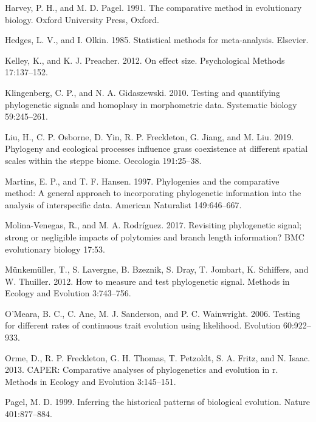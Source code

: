 \documentclass[
]{article}
\begin{document}
{\leavevmode\hypertarget{ref-HarveyPagel1991}{}%
Harvey, P. H., and M. D. Pagel. 1991. The comparative method in
evolutionary biology. Oxford University Press, Oxford.

\leavevmode\hypertarget{ref-HedgesOlkin1985}{}%
Hedges, L. V., and I. Olkin. 1985. Statistical methods for
meta-analysis. Elsevier.

\leavevmode\hypertarget{ref-Kelley2012}{}%
Kelley, K., and K. J. Preacher. 2012. On effect size. Psychological
Methods 17:137--152.

\leavevmode\hypertarget{ref-Klingenberg2010}{}%
Klingenberg, C. P., and N. A. Gidaszewski. 2010. Testing and quantifying
phylogenetic signals and homoplasy in morphometric data. Systematic
biology 59:245--261.

\leavevmode\hypertarget{ref-Liu2019}{}%
Liu, H., C. P. Osborne, D. Yin, R. P. Freckleton, G. Jiang, and M. Liu.
2019. Phylogeny and ecological processes influence grass coexistence at
different spatial scales within the steppe biome. Oecologia 191:25--38.

\leavevmode\hypertarget{ref-MartinsHansen1997}{}%
Martins, E. P., and T. F. Hansen. 1997. Phylogenies and the comparative
method: A general approach to incorporating phylogenetic information
into the analysis of interspecific data. American Naturalist
149:646--667.

\leavevmode\hypertarget{ref-MolinaVenegas2017}{}%
Molina-Venegas, R., and M. A. Rodríguez. 2017. Revisiting phylogenetic
signal; strong or negligible impacts of polytomies and branch length
information? BMC evolutionary biology 17:53.

\leavevmode\hypertarget{ref-Munkemuller_et_al2012}{}%
Münkemüller, T., S. Lavergne, B. Bzeznik, S. Dray, T. Jombart, K.
Schiffers, and W. Thuiller. 2012. How to measure and test phylogenetic
signal. Methods in Ecology and Evolution 3:743--756.

\leavevmode\hypertarget{ref-OMeara_et_al2006}{}%
O'Meara, B. C., C. Ane, M. J. Sanderson, and P. C. Wainwright. 2006.
Testing for different rates of continuous trait evolution using
likelihood. Evolution 60:922--933.

\leavevmode\hypertarget{ref-Orme2013}{}%
Orme, D., R. P. Freckleton, G. H. Thomas, T. Petzoldt, S. A. Fritz, and
N. Isaac. 2013. CAPER: Comparative analyses of phylogenetics and
evolution in r. Methods in Ecology and Evolution 3:145--151.

\leavevmode\hypertarget{ref-Pagel1999}{}%
Pagel, M. D. 1999. Inferring the historical patterns of biological
evolution. Nature 401:877--884.

}
\end{document}
